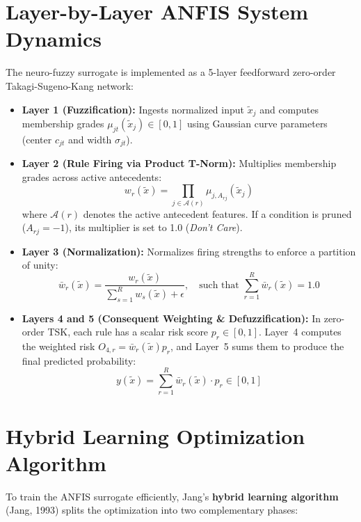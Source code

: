 \documentclass{report}
\begin{document}
\section{Layer-by-Layer ANFIS System Dynamics}

The neuro-fuzzy surrogate is implemented as a 5-layer feedforward zero-order Takagi-Sugeno-Kang network:
\begin{itemize}
    \setlength{\itemsep}{0pt}
    \setlength{\parskip}{0pt}
    \item \textbf{Layer 1 (Fuzzification):} Ingests normalized input $\tilde{x}_j$ and computes membership grades $\mu_{jt}(\tilde{x}_j) \in [0, 1]$ using Gaussian curve parameters (center $c_{jt}$ and width $\sigma_{jt}$).
    \item \textbf{Layer 2 (Rule Firing via Product T-Norm):} Multiplies membership grades across active antecedents:
    \begin{equation}
        w_r(\tilde{x}) = \prod_{j \in \mathcal{A}(r)} \mu_{j, A_{rj}}(\tilde{x}_j)
    \end{equation}
    where $\mathcal{A}(r)$ denotes the active antecedent features. If a condition is pruned ($A_{rj} = -1$), its multiplier is set to 1.0 (\textit{Don't Care}).
    \item \textbf{Layer 3 (Normalization):} Normalizes firing strengths to enforce a partition of unity:
    \begin{equation}
        \bar{w}_r(\tilde{x}) = \frac{w_r(\tilde{x})}{\sum_{s=1}^R w_s(\tilde{x}) + \epsilon}, \quad \text{such that } \sum_{r=1}^R \bar{w}_r(\tilde{x}) = 1.0
    \end{equation}
    \item \textbf{Layers 4 and 5 (Consequent Weighting \& Defuzzification):} In zero-order TSK, each rule has a scalar risk score $p_r \in [0, 1]$. Layer~4 computes the weighted risk $O_{4, r} = \bar{w}_r(\tilde{x}) p_r$, and Layer~5 sums them to produce the final predicted probability:
    \begin{equation}
        y(\tilde{x}) = \sum_{r=1}^R \bar{w}_r(\tilde{x}) \cdot p_r \in [0, 1]
    \end{equation}
\end{itemize}

\section{Hybrid Learning Optimization Algorithm}

To train the ANFIS surrogate efficiently, Jang's \textbf{hybrid learning algorithm} (Jang, 1993) splits the optimization into two complementary phases:
\end{document}
